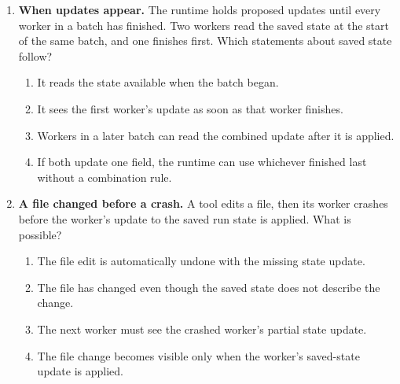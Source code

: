 \begin{enumerate}[start=31,itemsep=0.7\baselineskip]
\item\label{exercise:31} \begin{minipage}[t]{\linewidth}
\textbf{When updates appear.} The runtime holds proposed updates until every worker in a batch has finished. Two workers read the saved state at the start of the same batch, and one finishes first. Which statements about saved state follow?
\begin{enumerate}[label=\textnormal{(\Alph*)},leftmargin=*,itemsep=0pt]
\item It reads the state available when the batch began.
\item It sees the first worker's update as soon as that worker finishes.
\item Workers in a later batch can read the combined update after it is applied.
\item If both update one field, the runtime can use whichever finished last without a combination rule.
\end{enumerate}
\end{minipage}

\item\label{exercise:32} \begin{minipage}[t]{\linewidth}
\textbf{A file changed before a crash.} A tool edits a file, then its worker crashes before the worker's update to the saved run state is applied. What is possible?
\begin{enumerate}[label=\textnormal{(\Alph*)},leftmargin=*,itemsep=0pt]
\item The file edit is automatically undone with the missing state update.
\item The file has changed even though the saved state does not describe the change.
\item The next worker must see the crashed worker's partial state update.
\item The file change becomes visible only when the worker's saved-state update is applied.
\end{enumerate}
\end{minipage}


\end{enumerate}
